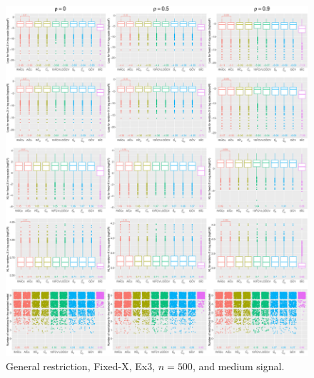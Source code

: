 \clearpage
\begin{figure}[!ht]
\centering
\includegraphics[width=\textwidth]{figures/supplement/fixedx/general_restriction/Ex3_n500_msnr.eps}
\caption{General restriction, Fixed-X, Ex3, $n=500$, and medium signal.}
\end{figure}
\clearpage

